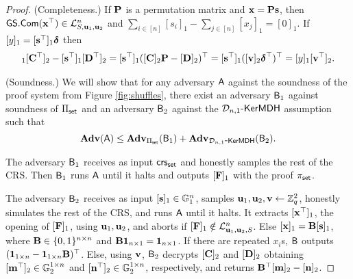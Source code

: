 \begin{proof}
(Completeness.) If $\mathbf{{P}}$ is a permutation matrix and $\mathbf{x}=\mathbf{{P}}\mathbf{s}$, then ${\mathsf{GS}}.\mathsf{Com}(\mathbf{x}^\top)\in\mathcal{L}_{S,\mathbf{u}_1,\mathbf{u}_2}^n$ and $\sum_{i\in[n]}[s_i]_1-\sum_{j\in[n]}[{x}_j]_1=[0]_1$. If $[y]_1=[\mathbf{s}^\top]_1{\boldsymbol \delta}$ then
\begin{eqnarray*}
    [\vecb{x}^\top]_1[\matr{C}^\top]_2-
    [\vecb{s}^\top]_1[\matr{D}^\top]_2
 = 
    [\vecb{s}^\top]_1([\matr{C}]_2\matr{P}-[\matr{D}]_2)^\top
 = 
    [\vecb{s}^\top]_1([\vecb{v}]_2\grkb{\delta}^\top)^\top
 =
    [y]_1[\vecb{v}^\top]_2.
\end{eqnarray*}

(Soundness.)
We will show that for any adversary $\mathsf{A}$ against the soundness of the proof system from Figure \ref{fig:shuffles}, there exist an adversary $\mathsf{B}_1$ against soundness of $\Pi_{\mathsf{set}}$ and an adversary $\mathsf{B}_2$ against the $\mathcal{D}_{n,1}\mbox{-}\mathsf{KerMDH}$ assumption such that
$$\mathbf{Adv}(\mathsf{A}) \leq \mathbf{Adv}_{\Pi_{\mathsf{set}}}(\mathsf{B}_1) + \mathbf{Adv}_{\mathcal{D}_{n,1}\mbox{-}\mathsf{KerMDH}}(\mathsf{B}_2).
$$

The adversary $\mathsf{B}_1$ receives as input $\mathsf{crs}_{\mathsf{set}}$ and honestly samples the rest of the CRS. Then $\mathsf{B}_1$ runs $\mathsf{A}$ until it halts and outputs $[\mathbf{{F}}]_1$ with the proof $\pi_{\mathsf{set}}$.

The adversary $\mathsf{B}_2$ receives as input $[\mathbf{s}]_1\in\mathbb{G}_1^{n}$, samples $\mathbf{u}_1,\mathbf{u}_2,\mathbf{v}\gets \mathbb{Z}_q^2$, honestly simulates the rest of the CRS, and runs $\mathsf{A}$ until it halts. It extracts $[\mathbf{x}^\top]_1$, the opening of $[\mathbf{{F}}]_1$, using $\mathbf{u}_1,\mathbf{u}_2$, and aborts if $[\mathbf{{F}}]_1\notin\mathcal{L}_{\mathbf{u}_1,\mathbf{u}_2,S}^n$. Else $[\mathbf{x}]_1=\mathbf{{B}}[\mathbf{s}]_1$, where $\mathbf{{B}}\in\{0,1\}^{n\times n}$ and $\mathbf{{B}}\mathbf{{1}}_{n\times 1}=\mathbf{{1}}_{n\times 1}$. If there are repeated $x_i$s, $\mathsf{B}$ outputs $(\mathbf{{1}}_{1\times n}-\mathbf{{1}}_{1\times n}\mathbf{{B}})^\top$. Else, using $\mathbf{v}$, $\mathsf{B}_2$ decrypts $[\mathbf{{C}}]_2$ and $[\mathbf{{D}}]_2$ obtaining $[\mathbf{m}^\top]_2\in\mathbb{G}_2^{1\times n}$ and $[\mathbf{n}^\top]_2\in\mathbb{G}_2^{1\times n}$, respectively, and returns $\mathbf{{B}}^\top[\mathbf{m}]_2-[\mathbf{n}]_2$.


\end{proof}
